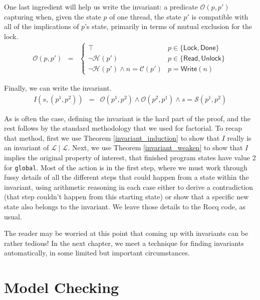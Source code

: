 \documentclass{amsbook}
\theoremstyle{definition}
\theoremstyle{remark}
\numberwithin{section}{chapter}
\numberwithin{equation}{chapter}
\begin{document}
One last ingredient will help us write the invariant: a predicate $\mathcal O(p, p')$ capturing when, given the state $p$ of one thread, the state $p'$ is compatible with all of the implications of $p$'s state, primarily in terms of mutual exclusion for the lock.
\begin{eqnarray*}
  \mathcal O(p, p') &=& \begin{cases}
    \top & p \in \{\mathsf{Lock}, \mathsf{Done}\} \\
    \neg \mathcal H(p') & p \in \{\mathsf{Read}, \mathsf{Unlock}\} \\
    \neg \mathcal H(p') \land n = \mathcal C(p') & p = \mathsf{Write}(n)
  \end{cases}
\end{eqnarray*}

Finally, we can write the invariant.
\invariants
\begin{eqnarray*}
  I(s, (p^1, p^2)) &=& \mathcal O(p^1, p^2) \land \mathcal O(p^2, p^1) \land s = \mathcal S(p^1, p^2)
\end{eqnarray*}

As is often the case, defining the invariant is the hard part of the proof, and the rest follows by the standard methodology that we used for factorial.
To recap that method, first we use Theorem \ref{invariant_induction} to show that $I$ really is an invariant of $\mathcal L \mid \mathcal L$.
Next, we use Theorem \ref{invariant_weaken} to show that $I$ implies the original property of interest, that finished program states have value 2 for \texttt{global}.
Most of the action is in the first step, where we must work through fussy details of all the different steps that could happen from a state within the invariant, using arithmetic reasoning in each case either to derive a contradiction (that step couldn't happen from this starting state) or show that a specific new state also belongs to the invariant.
We leave those details to the Rocq code, as usual.

The reader may be worried at this point that coming up with invariants can be rather tedious!
In the next chapter, we meet a technique for finding invariants automatically, in some limited but important circumstances.



\chapter{\label{model_checking}Model Checking}
\end{document}
